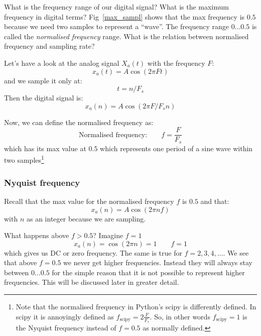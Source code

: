 \documentclass[12pt,a4paper]{article}
\begin{document}
What is the frequency range of our digital signal? What is
the maximum frequency in digital terms? Fig~\ref{max_sampl} shows that the
max frequency is $0.5$ because we need two samples to
represent a ``wave''. The frequency range $0\ldots 0.5$
is called the \textsl{normalised frequency} range. What is the relation
between normalised frequency and sampling rate?

Let's have a look at the analog signal $X_{a}(t)$ with the frequency $F$:
\begin{equation}
x_{a}(t) = A\cos (2\pi F t)
\end{equation}
and we sample it only at:
\begin{equation}
t = n/F_s
\end{equation}
Then the digital signal is:
\begin{equation}
x_{a}(n) = A \cos (2 \pi F/F_s n)
\end{equation}

Now, we can define the normalised frequency as:
\begin{equation}
\mbox{Normalised frequency:} \qquad f =  \frac {F}{F_s}
\end{equation}
which has its max value at $0.5$ which represents one period of
a sine wave within two samples\footnote{Note that the normalised
frequency in Python's scipy is differently defined. In scipy it is
annoyingly defined as $f_{\mbox{scipy}} =  2 \frac {F}{F_s}$. So, in other
words $f_{\mbox{scipy}}=1$ is the Nyquist frequency instead
of $f=0.5$ as normally defined.}


\subsubsection{Nyquist frequency}
Recall that the max value for the normalised frequency $f$ is $0.5$
and that:
\begin{equation}
x_{a}(n) = A \cos (2 \pi n f)
\end{equation}
with $n$ as an integer because
we are sampling.

What happens above $f>0.5$? Imagine $f = 1$
\begin{equation}
x_{a}(n) = \cos (2 \pi n) = 1 \qquad f=1
\end{equation}
which gives us DC or zero frequency. The same is true for
$f = 2, 3, 4, \ldots$. We see that above $f=0.5$ we never
get higher frequencies. Instead they will always stay between
$0\ldots 0.5$ for the simple reason that it is not possible
to represent higher frequencies. This will be discussed later
in greater detail.
\end{document}
